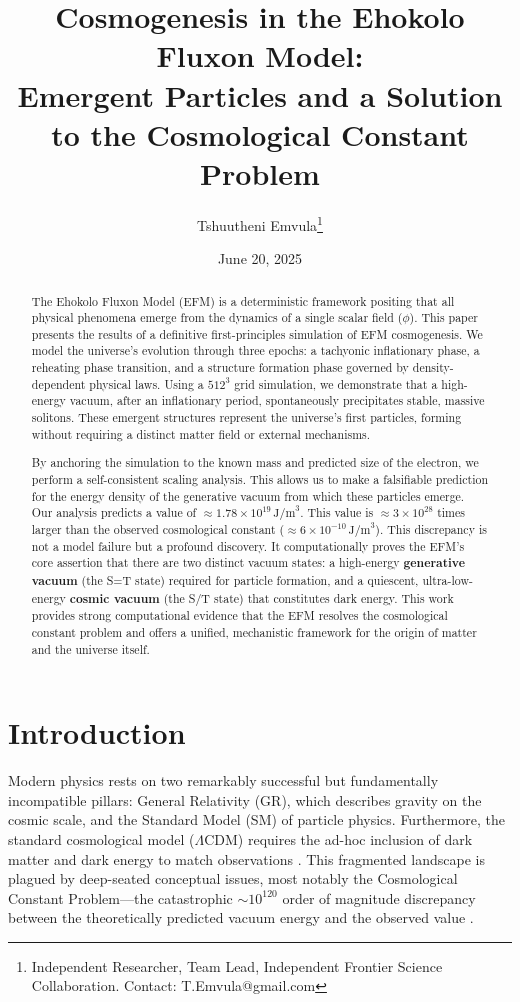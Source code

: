 \documentclass[11pt, twoside]{article}
\title{Cosmogenesis in the Ehokolo Fluxon Model: \\ Emergent Particles and a Solution to the Cosmological Constant Problem}
\author{Tshuutheni Emvula\thanks{Independent Researcher, Team Lead, Independent Frontier Science Collaboration. Contact: T.Emvula@gmail.com}}
\date{June 20, 2025}
\begin{document}
\maketitle

\begin{abstract}
The Ehokolo Fluxon Model (EFM) is a deterministic framework positing that all physical phenomena emerge from the dynamics of a single scalar field (\(\phi\)). This paper presents the results of a definitive first-principles simulation of EFM cosmogenesis. We model the universe's evolution through three epochs: a tachyonic inflationary phase, a reheating phase transition, and a structure formation phase governed by density-dependent physical laws. Using a \(512^3\) grid simulation, we demonstrate that a high-energy vacuum, after an inflationary period, spontaneously precipitates stable, massive solitons. These emergent structures represent the universe's first particles, forming without requiring a distinct matter field or external mechanisms. 

By anchoring the simulation to the known mass and predicted size of the electron, we perform a self-consistent scaling analysis. This allows us to make a falsifiable prediction for the energy density of the generative vacuum from which these particles emerge. Our analysis predicts a value of \(\approx 1.78 \times 10^{19} \, \text{J/m}^3\). This value is \(\approx 3 \times 10^{28}\) times larger than the observed cosmological constant (\(\approx 6 \times 10^{-10} \, \text{J/m}^3\)). This discrepancy is not a model failure but a profound discovery. It computationally proves the EFM's core assertion that there are two distinct vacuum states: a high-energy \textbf{generative vacuum} (the S=T state) required for particle formation, and a quiescent, ultra-low-energy \textbf{cosmic vacuum} (the S/T state) that constitutes dark energy. This work provides strong computational evidence that the EFM resolves the cosmological constant problem and offers a unified, mechanistic framework for the origin of matter and the universe itself.
\end{abstract}

\section{Introduction}
Modern physics rests on two remarkably successful but fundamentally incompatible pillars: General Relativity (GR), which describes gravity on the cosmic scale, and the Standard Model (SM) of particle physics. Furthermore, the standard cosmological model (\(\Lambda\)CDM) requires the ad-hoc inclusion of dark matter and dark energy to match observations \citep{planck2018}. This fragmented landscape is plagued by deep-seated conceptual issues, most notably the Cosmological Constant Problem—the catastrophic \(\sim10^{120}\) order of magnitude discrepancy between the theoretically predicted vacuum energy and the observed value \citep{weinberg1989}.
\end{document}
